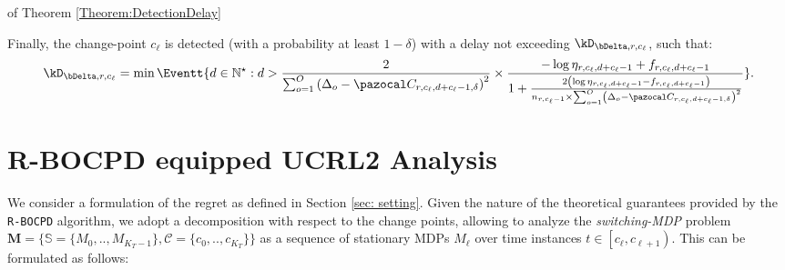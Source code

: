 \documentclass{article} %
\begin{document}
\begin{myproof}{of Theorem \ref{Theorem:DetectionDelay}}
	
	Finally, the change-point $c_\ell$ is detected (with a probability at least $1-\delta$) with a delay not exceeding $\kD_{\bDelta,r,c_\ell}$, such that:
	\begin{align*}
	\kD_{\bDelta,r,c_\ell} =  \min \Eventt{d \in \mathbb{N}^\star: d > \frac{2}{\sum_{o=1}^{O}\left(\Delta_o - \pC_{r,c_\ell, d+ c_\ell-1 ,\delta}  \right)^2}\times \frac{-\log \eta_{r,c_\ell,d+c_\ell-1} + f_{r,c_\ell,d+c_\ell-1}}{1+\frac{2\left(\log \eta_{r,c_\ell,d+c_\ell-1} - f_{r,c_\ell,d+c_\ell-1}\right)}{n_{r,c_\ell-1}\times  \sum_{o=1}^{O}\left(\Delta_o - \pC_{r,c_\ell, d+ c_\ell-1 ,\delta}  \right)^2}}}.
	\end{align*}


\end{myproof}








\newpage

\section{R-BOCPD equipped UCRL2 Analysis}
We consider a formulation of the regret as defined in Section \ref{sec: setting}. Given the nature of the theoretical guarantees provided by the \texttt{R-BOCPD} algorithm, we adopt a decomposition with respect to the change points, allowing to analyze the \textit{switching-MDP} problem $\mathbf{M} = \{\mathbb{S}=\{M_0,..,M_{K_T-1}\}, \mathcal{C}=\{c_0,..,c_{K_T}\}\}$ as a sequence of stationary MDPs $M_\ell$ over time instances $t \in \left[c_\ell, c_{\ell+1}\right)$. This can be formulated as follows:
\end{document}
